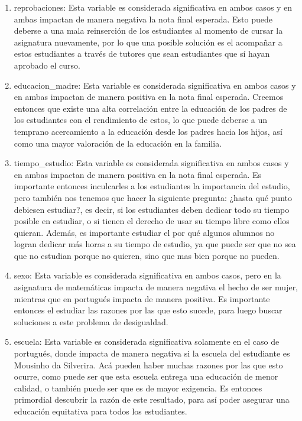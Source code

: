 \documentclass[
]{article}
\begin{document}
\begin{enumerate}
\def\labelenumi{\arabic{enumi}.}
\item
  reprobaciones: Esta variable es considerada significativa en ambos
  casos y en ambas impactan de manera negativa la nota final esperada.
  Esto puede deberse a una mala reinserción de los estudiantes al
  momento de cursar la asignatura nuevamente, por lo que una posible
  solución es el acompañar a estos estudiantes a través de tutores que
  sean estudiantes que sí hayan aprobado el curso.
\item
  educacion\_madre: Esta variable es considerada significativa en ambos
  casos y en ambas impactan de manera positiva en la nota final
  esperada. Creemos entonces que existe una alta correlación entre la
  educación de los padres de los estudiantes con el rendimiento de
  estos, lo que puede deberse a un temprano acercamiento a la educación
  desde los padres hacia los hijos, así como una mayor valoración de la
  educación en la familia.
\item
  tiempo\_estudio: Esta variable es considerada significativa en ambos
  casos y en ambas impactan de manera positiva en la nota final
  esperada. Es importante entonces inculcarles a los estudiantes la
  importancia del estudio, pero también nos tenemos que hacer la
  siguiente pregunta: ¿hasta qué punto debiesen estudiar?, es decir, si
  los estudiantes deben dedicar todo su tiempo posible en estudiar, o si
  tienen el derecho de usar su tiempo libre como ellos quieran. Además,
  es importante estudiar el por qué algunos alumnos no logran dedicar
  más horas a su tiempo de estudio, ya que puede ser que no sea que no
  estudian porque no quieren, sino que mas bien porque no pueden.
\item
  sexo: Esta variable es considerada significativa en ambos casos, pero
  en la asignatura de matemáticas impacta de manera negativa el hecho de
  ser mujer, mientras que en portugués impacta de manera positiva. Es
  importante entonces el estudiar las razones por las que esto sucede,
  para luego buscar soluciones a este problema de desigualdad.
\item
  escuela: Esta variable es considerada significativa solamente en el
  caso de portugués, donde impacta de manera negativa si la escuela del
  estudiante es Mousinho da Silverira. Acá pueden haber muchas razones
  por las que esto ocurre, como puede ser que esta escuela entrega una
  educación de menor calidad, o también puede ser que es de mayor
  exigencia. Es entonces primordial descubrir la razón de este
  resultado, para así poder asegurar una educación equitativa para todos
  los estudiantes.
\end{enumerate}
\end{document}
